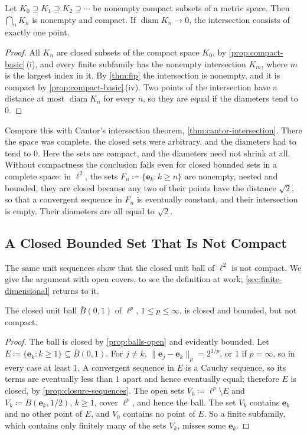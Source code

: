\begin{corollary}
\label{cor:nested-compact}
Let $K_0\supseteq K_1\supseteq K_2\supseteq\cdots$ be nonempty compact subsets of a metric space. Then $\bigcap_nK_n$ is nonempty and compact. If $\operatorname{diam}K_n\to0$, the intersection consists of exactly one point.
\end{corollary}

\begin{proof}
All $K_n$ are closed subsets of the compact space $K_0$, by \cref{prop:compact-basic}\,(i), and every finite subfamily has the nonempty intersection $K_m$, where $m$ is the largest index in it. By \cref{thm:fip} the intersection is nonempty, and it is compact by \cref{prop:compact-basic}\,(iv). Two points of the intersection have a distance at most $\operatorname{diam}K_n$ for every $n$, so they are equal if the diameters tend to $0$.
\end{proof}

Compare this with Cantor's intersection theorem, \cref{thm:cantor-intersection}. There the space was complete, the closed sets were arbitrary, and the diameters had to tend to $0$. Here the sets are compact, and the diameters need not shrink at all. Without compactness the conclusion fails even for closed bounded sets in a complete space: in $\ell^2$, the sets $F_n\coloneqq\{\mathbf e_k: k\ge n\}$ are nonempty, nested and bounded, they are closed because any two of their points have the distance $\sqrt2$, so that a convergent sequence in $F_n$ is eventually constant, and their intersection is empty. Their diameters are all equal to $\sqrt2$.

\subsection{A Closed Bounded Set That Is Not Compact}

The same unit sequences show that the closed unit ball of $\ell^2$ is not compact. We give the argument with open covers, to see the definition at work; \cref{sec:finite-dimensional} returns to it.

\begin{proposition}
\label{prop:l2-ball-not-compact}
The closed unit ball $\bar B(0,1)$ of $\ell^p$, $1\le p\le\infty$, is closed and bounded, but not compact.
\end{proposition}

\begin{proof}
The ball is closed by \cref{prop:balls-open} and evidently bounded. Let $E\coloneqq\{\mathbf e_k: k\ge1\}\subseteq\bar B(0,1)$. For $j\ne k$, $\|\mathbf e_j-\mathbf e_k\|_p=2^{1/p}$, or $1$ if $p=\infty$, so in every case at least $1$. A convergent sequence in $E$ is a Cauchy sequence, so its terms are eventually less than $1$ apart and hence eventually equal; therefore $E$ is closed, by \cref{prop:closure-sequences}. The open sets $V_0\coloneqq\ell^p\setminus E$ and $V_k\coloneqq B(\mathbf e_k,1/2)$, $k\ge1$, cover $\ell^p$, and hence the ball. The set $V_k$ contains $\mathbf e_k$ and no other point of $E$, and $V_0$ contains no point of $E$. So a finite subfamily, which contains only finitely many of the sets $V_k$, misses some $\mathbf e_k$.
\end{proof}

